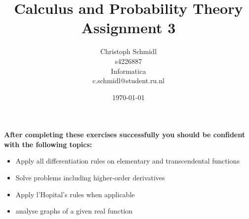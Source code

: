\documentclass[a4paper]{article}
\title{Calculus and Probability Theory\\ Assignment 3}
\author{Christoph Schmidl\\
s4226887\\
Informatica\\
c.schmidl@student.ru.nl\\}
\date{\today}
\begin{document}
\maketitle

\textbf{After completing these exercises successfully you should be confident with the following topics:}

\begin{itemize}
	\item Apply all differentiation rules on elementary and transcendental functions 
	\item Solve problems including higher-order derivatives
	\item Apply l'Hopital's rules when applicable
	\item analyse graphs of a given real function
\end{itemize}
\vspace{1em}
\end{document}

